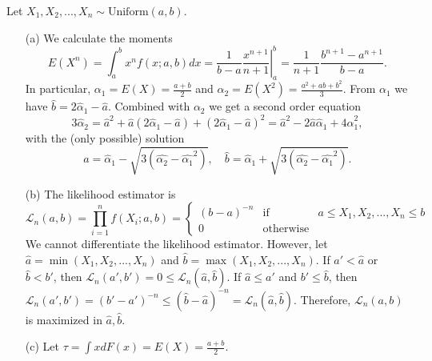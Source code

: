 Let $X_1, X_2, ..., X_n \sim \mathrm{Uniform}(a, b)$.
\begin{itemize}
    \item[(a)] We calculate the moments
        \begin{equation*}
            E(X^n)
                = \int_a^b x^n f(x;a,b) dx
                = \left. \frac{1}{b - a} \frac{x^{n+1}}{n + 1} \right|_a^b
                = \frac{1}{n + 1} \frac{b^{n+1} - a^{n+1}}{b - a}.
        \end{equation*}
        In particular, $\alpha_1 = E(X) = \frac{a + b}{2}$ and $\alpha_2 = E(X^2) = \frac{a^2 + ab + b^2}{3}$.
        From $\alpha_1$ we have $\hat{b} = 2\hat{\alpha}_1 - \hat{a}$.
        Combined with $\alpha_2$ we get a second order equation
        \begin{equation*}
            3\hat{\alpha}_2
                = \hat{a}^2 + \hat{a}(2\hat{\alpha}_1 - \hat{a}) + (2\hat{\alpha}_1 - \hat{a})^2
                = \hat{a}^2 - 2\hat{a}\hat{\alpha}_1 + 4\hat{\alpha}_1^2,
        \end{equation*}
        with the (only possible) solution
        \begin{equation*}
            \hat{a} = \hat{\alpha}_1 - \sqrt{3(\hat{\alpha_2} - \hat{\alpha_1}^2)}, \quad
            \hat{b} = \hat{\alpha}_1 + \sqrt{3(\hat{\alpha_2} - \hat{\alpha_1}^2)}.
        \end{equation*}
    \item[(b)] The likelihood estimator is
        \begin{equation*}
            \mathcal{L}_n(a, b)
                = \prod_{i = 1}^n f(X_i;a,b)
                = \left\{ \begin{array}{lll}
                    (b - a)^{-n} & \text{if} & a \leq X_1, X_2, ..., X_n \leq b \\
                    0 & \text{otherwise}
                \end{array} \right.
        \end{equation*}
        We cannot differentiate the likelihood estimator.
        However, let $\hat{a} = \min(X_1, X_2, ..., X_n)$ and $\hat{b} = \max(X_1, X_2, ..., X_n)$.
        If $a' < \hat{a}$ or $\hat{b} < b'$, then $\mathcal{L}_n(a', b') = 0 \leq \mathcal{L}_n(\hat{a}, \hat{b})$.
        If $\hat{a} \leq a'$ and $b' \leq \hat{b}$, then $\mathcal{L}_n(a', b') = (b' - a')^{-n} \leq (\hat{b} - \hat{a})^{-n} = \mathcal{L}_n(\hat{a}, \hat{b})$.
        Therefore, $\mathcal{L}_n(a, b)$ is maximized in $\hat{a}, \hat{b}$.
    \item[(c)] Let $\tau = \int x dF(x) = E(X) = \frac{a + b}{2}$.

\end{itemize}
